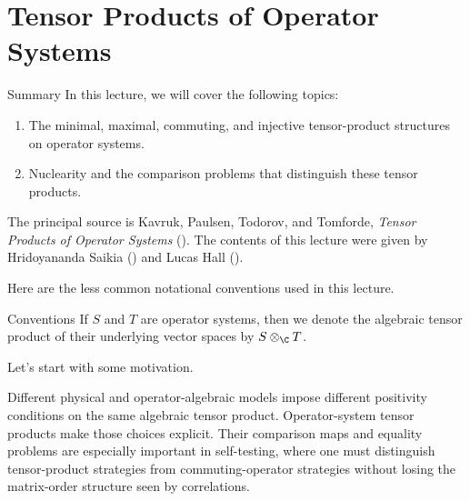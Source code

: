 \documentclass[main.tex]{subfiles}
\begin{document}
\newpage
\section{Tensor Products of Operator Systems}
\label{sec:tensor-products-of-operator-systems}

\begin{motivation}{\large Summary}{}
In this lecture, we will cover the following topics:
\begin{enumerate}
    \item The minimal, maximal, commuting, and injective tensor-product
    structures on operator systems.
    \item Nuclearity and the comparison problems that distinguish these
    tensor products.
\end{enumerate}
The principal source is Kavruk, Paulsen, Todorov, and Tomforde,
\emph{Tensor Products of Operator Systems} (\cite{kavruk-paulsen-todorov-tomforde-2011}). The contents of this lecture were given by Hridoyananda Saikia () and Lucas Hall (). 
\end{motivation}

Here are the less common notational conventions used in this lecture.

\begin{filingbox}[NavyBlue]{Conventions}
If $S$ and $T$ are operator systems, then we denote the algebraic tensor product of their underlying vector spaces by $\tensor{\C}{S}{T}$.
\end{filingbox}

\newpage

Let's start with some motivation.

\begin{motiv}
Different physical and operator-algebraic models impose different positivity
conditions on the same algebraic tensor product.  Operator-system tensor
products make those choices explicit.  Their comparison maps and equality
problems are especially important in self-testing, where one must distinguish
tensor-product strategies from commuting-operator strategies without losing
the matrix-order structure seen by correlations.
\end{motiv}
\end{document}
